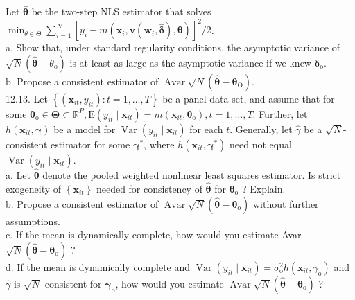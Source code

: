\documentclass[10pt]{article}
\begin{document}
Let $\hat{\boldsymbol{\theta}}$ be the two-step NLS estimator that solves\\
$\min _{\theta \in \Theta} \sum_{i=1}^{N}\left[y_{i}-m\left(\mathbf{x}_{i}, \mathbf{v}\left(\mathbf{w}_{i}, \hat{\boldsymbol{\delta}}\right), \boldsymbol{\theta}\right)\right]^{2} / 2$.\\
a. Show that, under standard regularity conditions, the asymptotic variance of $\sqrt{N}\left(\hat{\boldsymbol{\theta}}-\theta_{\mathrm{o}}\right)$ is at least as large as the asymptotic variance if we knew $\boldsymbol{\delta}_{\mathrm{o}}$.\\
b. Propose a consistent estimator of $\operatorname{Avar} \sqrt{N}\left(\hat{\boldsymbol{\theta}}-\boldsymbol{\theta}_{\mathrm{O}}\right)$.\\
12.13. Let $\left\{\left(\mathbf{x}_{i t}, y_{i t}\right): t=1, \ldots, T\right\}$ be a panel data set, and assume that for some $\boldsymbol{\theta}_{\mathrm{o}} \in \boldsymbol{\Theta} \subset \mathbb{R}^{P}, \mathrm{E}\left(y_{i t} \mid \mathbf{x}_{i t}\right)=m\left(\mathbf{x}_{i t}, \boldsymbol{\theta}_{\mathrm{o}}\right), t=1, \ldots, T$. Further, let $h\left(\mathbf{x}_{i t}, \boldsymbol{\gamma}\right)$ be a model for $\operatorname{Var}\left(y_{i t} \mid \mathbf{x}_{i t}\right)$ for each $t$. Generally, let $\hat{\gamma}$ be a $\sqrt{N}$-consistent estimator for some $\boldsymbol{\gamma}^{*}$, where $h\left(\mathbf{x}_{i t}, \boldsymbol{\gamma}^{*}\right)$ need not equal $\operatorname{Var}\left(y_{i t} \mid \mathbf{x}_{i t}\right)$.\\
a. Let $\hat{\boldsymbol{\theta}}$ denote the pooled weighted nonlinear least squares estimator. Is strict exogeneity of $\left\{\mathbf{x}_{i t}\right\}$ needed for consistency of $\hat{\boldsymbol{\theta}}$ for $\boldsymbol{\theta}_{\mathrm{o}}$ ? Explain.\\
b. Propose a consistent estimator of $\operatorname{Avar} \sqrt{N}\left(\hat{\boldsymbol{\theta}}-\boldsymbol{\theta}_{\mathrm{o}}\right)$ without further assumptions.\\
c. If the mean is dynamically complete, how would you estimate Avar $\sqrt{N}\left(\hat{\boldsymbol{\theta}}-\boldsymbol{\theta}_{\mathrm{o}}\right)$ ?\\
d. If the mean is dynamically complete and $\operatorname{Var}\left(y_{i t} \mid \mathbf{x}_{i t}\right)=\sigma_{\mathrm{o}}^{2} h\left(\mathbf{x}_{i t}, \gamma_{\mathrm{o}}\right)$ and $\hat{\gamma}$ is $\sqrt{N}$ consistent for $\boldsymbol{\gamma}_{\mathrm{o}}$, how would you estimate $\operatorname{Avar} \sqrt{N}\left(\hat{\boldsymbol{\theta}}-\boldsymbol{\theta}_{\mathrm{o}}\right)$ ?\\
\end{document}
